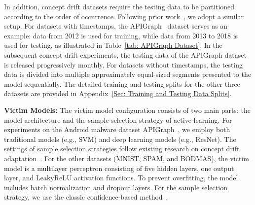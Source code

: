 \documentclass[conference,compsoc]{IEEEtran} %
\begin{document}
In addition, concept drift datasets require the testing data to be partitioned according to the order of occurrence.
Following prior work~\cite{2023-Usenix-chenyizhen}, we adopt a similar setup. 
For datasets with timestamps, the APIGraph~\cite{2020-CCS-APIGraph} dataset serves as an example: data from 2012 is used for training, while data from 2013 to 2018 is used for testing, as illustrated in Table~\ref{tab: APIGraph Dataset}.
In the subsequent concept drift experiments, the testing data of the APIGraph dataset is released progressively monthly.
For datasets without timestamps, the testing data is divided into multiple approximately equal-sized segments presented to the model sequentially.
The detailed training and testing splits for the other three datasets are provided in Appendix~\ref{Sec: Training and Testing Data Splits}.

\textbf{Victim Models:} 
The victim model  configuration consists of two main parts: the model architecture and the sample selection strategy of active learning.
For experiments on the Android malware dataset APIGraph~\cite{2020-CCS-APIGraph}, we employ both traditional models (e.g., SVM) and deep learning models (e.g., ResNet).
The settings of sample selection strategies follow existing research on concept drift adaptation~\cite{2023-Usenix-chenyizhen,2022-SP-Trancending,2021-Usenix-CDAE,2023-survey-uncertainty-in-deep-neural-networks}.
For the other datasets (MNIST, SPAM, and BODMAS), the victim model is a multilayer perceptron consisting of five hidden layers, one output layer, and LeakyReLU activation functions.
To prevent overfitting, the model includes batch normalization and dropout layers.
For the sample selection strategy, we use the classic confidence-based method~\cite{2023-survey-uncertainty-in-deep-neural-networks}.
\end{document}
